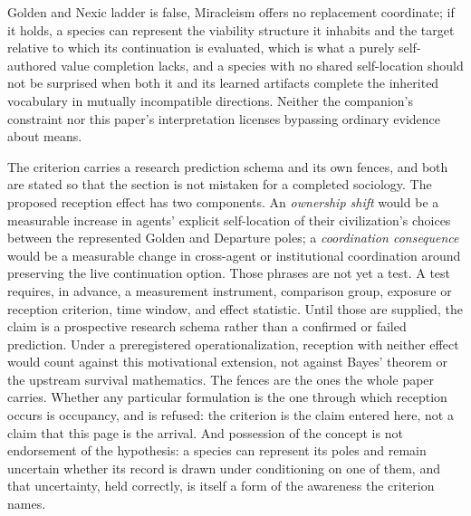 Golden and Nexic ladder is false, Miracleism offers no replacement
coordinate; if it holds, a species can represent the viability
structure it inhabits and the target relative to which its continuation
is evaluated, which is what a purely self-authored value completion
lacks, and a species with no shared self-location should not be
surprised when both it and its learned artifacts complete the inherited
vocabulary in mutually incompatible directions. Neither the companion's
constraint nor this paper's interpretation licenses bypassing ordinary
evidence about means.

The criterion carries a research prediction schema and its own
fences, and both are stated so that the section is not mistaken for a
completed sociology. The proposed reception effect has two components.
An \emph{ownership shift} would be a measurable increase in agents'
explicit self-location of their civilization's choices between the
represented Golden and Departure poles; a \emph{coordination
consequence} would be a measurable change in cross-agent or
institutional coordination around preserving the live continuation
option. Those phrases are not yet a test. A test requires, in advance,
a measurement instrument, comparison group, exposure or reception
criterion, time window, and effect statistic. Until those are supplied,
the claim is a prospective research schema rather than a confirmed or
failed prediction. Under a preregistered operationalization, reception
with neither effect would count against this motivational extension,
not against Bayes' theorem or the upstream survival mathematics. The
fences are the ones the whole paper carries. Whether any particular formulation is the one through which
reception occurs is occupancy, and is refused: the criterion is the
claim entered here, not a claim that this page is the arrival. And
possession of the concept is not endorsement of the hypothesis: a
species can represent its poles and remain uncertain whether its record
is drawn under conditioning on one of them, and that uncertainty, held
correctly, is itself a form of the awareness the criterion names.

